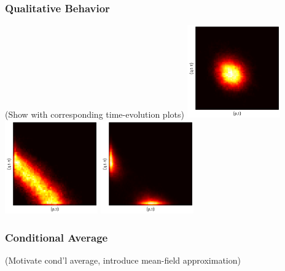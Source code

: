 \documentclass[xcolor={usenames,dvipsnames,svgnames}]{beamer}
\begin{document}
\begin{frame}
    \frametitle{Qualitative Behavior}

    (Show with corresponding time-evolution plots)
    \includegraphics[width=0.3\textwidth]{../results/presentation/ddjd-a100-c1.png}
    \includegraphics[width=0.3\textwidth]{../results/presentation/ddjd-a100-c3,3.png}
    \includegraphics[width=0.3\textwidth]{../results/presentation/ddjd-a100-c4,7.png}
\end{frame}

\begin{frame}
    \frametitle{Conditional Average}

    (Motivate cond'l average, introduce mean-field approximation)
\end{frame}
\end{document}
